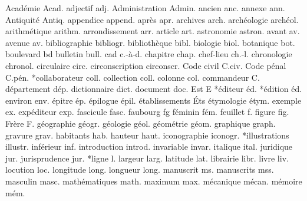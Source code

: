 {Acad\'{e}mie}          Acad.%
adjectif            adj.%
{Administration}    Admin.%
ancien              anc.%
annexe              ann.%
{Antiquit\'{e}}         Antiq.%
appendice           append.%
apr\`{e}s               apr.%
archives            arch.%
arch\'{e}ologie         arch\'{e}ol.%
arithm\'{e}tique        arithm.%
arrondissement      arr.%
article             art.%
astronomie          astron.%
avant               av.%
avenue              av.%
bibliographie       bibliogr.%
biblioth\`{e}que    bibl.%
biologie            biol.%
botanique           bot.%
boulevard           bd%
bulletin            bull.%
cad                 \noexpand\hbox{c.-\`{a}-d.}%
chapitre            chap.%
chef-lieu           ch.-l.%
chronologie         chronol.%
circulaire          circ.%
circonscription     circonscr.%
{Code civil}        C.civ.%
{Code p\'{e}nal}        C.p\'{e}n.%
*collaborateur      coll.%
collection          coll.%
colonne             col.%
commandeur          C.%
d\'{e}partement         d\'{e}p.%
dictionnaire        dict.%
document            doc.%
{Est}               E%
*\'{e}diteur            \'{e}d.%
*\'{e}dition            \'{e}d.%
environ             env.%
\'{e}pitre              \'{e}p.%
\'{e}pilogue            \'{e}pil.%
\'{e}tablissements      \'{E}ts%
\'{e}tymologie          \'{e}tym.%
exemple             ex.%
exp\'{e}diteur          exp.%
fascicule           fasc.%
faubourg            fg%
f\'{e}minin             f\'{e}m.%
feuillet            f.%
figure              fig.%
Fr\`{e}re               F.%
g\'{e}ographie          g\'{e}ogr.%
g\'{e}ologie            g\'{e}ol.%
g\'{e}om\'{e}trie           g\'{e}om.%
graphique           graph.%
gravure             grav.%
habitants           hab.%
hauteur             haut.%
iconographie        iconogr.%
*illustrations      illustr.%
inf\'{e}rieur           inf.%
introduction        introd.%
invariable          invar.%
italique            ital.%
juridique           jur.%
jurisprudence       jur.%
*ligne              l.%
largeur             larg.%
latitude            lat.%
librairie           libr.%
livre               liv.%
locution            loc.%
longitude           long.%
longueur            long.%
manuscrit           ms.%
manuscrits          mss.%
masculin            masc.%
math\'{e}matiques       math.%
maximum             max.%
m\'{e}canique           m\'{e}can.%
m\'{e}moire             m\'{e}m.%
